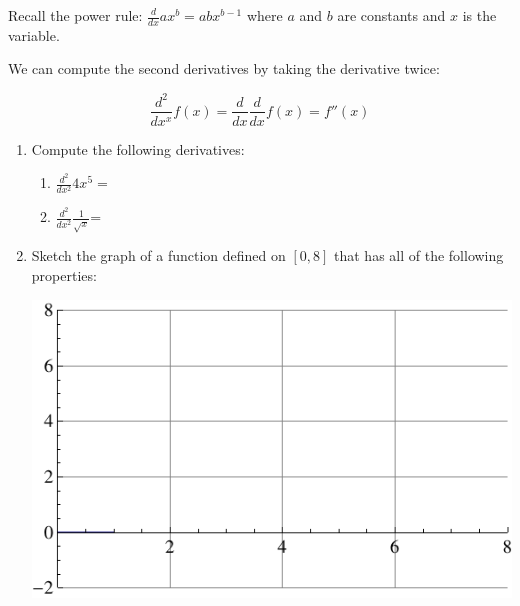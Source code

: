 \documentclass[12pt]{article}
\begin{document}
Recall the power rule: $\frac{d}{dx}ax^b = abx^{b-1}$ where $a$ and $b$ are constants and $x$ is the variable.

We can compute the second derivatives by taking the derivative twice:

$$\frac{d^2}{dx^x} f(x)=\frac{d}{dx} \frac{d}{dx} f(x) = f''(x)$$

\begin{enumerate}
\item Compute the following derivatives:

\begin{enumerate}
\item $\displaystyle \frac{d^2}{dx^2} 4x^5=$ \vskip 1in
\item  $\displaystyle \frac{d^2}{dx^2} \frac{1}{\sqrt{x}}$= 
\end{enumerate}

\newpage


\item Sketch the graph of a function defined on $[0,8]$ that has all of the following properties:

\begin{itemize}
\end{itemize}

\vspace{2cm}

\includegraphics[scale=1.5]{grid.pdf}


\end{enumerate}
\end{document}
